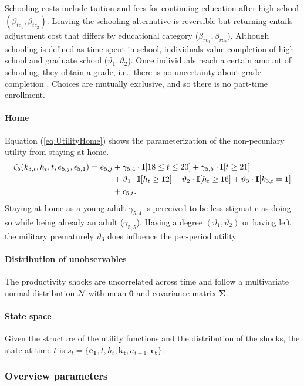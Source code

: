 %
Schooling costs include tuition and fees for continuing education after high school $(\beta_{tc_1}, \beta_{tc_2})$. Leaving the schooling alternative is reversible but returning entails adjustment cost that differs by educational category ($\beta_{rc_1}, \beta_{rc_2}$). Although schooling is defined as time spent in school, individuals value completion of high-school and graduate school ($\vartheta_1, \vartheta_2$). Once individuals reach a certain amount of schooling, they obtain a grade, i.e., there is no uncertainty about grade completion \citep{Altonji.1993}. Choices are mutually exclusive, and so there is no part-time enrollment.
\FloatBarrier\paragraph*{Home}
Equation (\ref{eq:UtilityHome}) shows the parameterization of the non-pecuniary utility from staying at home.
%
\begin{align}\label{eq:UtilityHome}
	\zeta_5(k_{3,t}, h_t, t, e_{5,j}, \epsilon_{5,1}) =  e_{5,j} & + \gamma_{5,4} \cdot {\textbf{I}}[18 \leq t \leq 20] + \gamma_{5,5} \cdot {\textbf{I}}[t \geq 21] \\ \nonumber
    							   & +\vartheta_{1} \cdot {\textbf{I}}[h_t \geq 12] + \vartheta_{2} \cdot {\textbf{I}}[h_t \geq 16] +  \vartheta_3 \cdot {\textbf{I}}[k_{3,t} = 1]  \\ \nonumber
    							   & + \epsilon_{5,t}.
\end{align}
%
Staying at home as a young adult $\gamma_{5, 4}$ is perceived to be less stigmatic as doing so while being already an adult ($\gamma_{5,5}$). Having a degree  $(\vartheta_1, \vartheta_2)$ or having left the military prematurely  $\vartheta_3$ does influence the per-period utility.

\paragraph{Distribution of unobservables} The productivity shocks are uncorrelated across time and follow a multivariate normal distribution $\mathcal{N}$ with mean $\bm{0}$ and covariance matrix $\bm{\Sigma}$.

\paragraph{State space} Given the structure of the utility functions and the distribution of the shocks, the state at time $t$ is $s_t = \{\bm{e_1}, t, h_t, \bm{k_t}, a_{t -1}, \bm{\epsilon_t}\}$.

\FloatBarrier\subsubsection*{Overview parameters}


